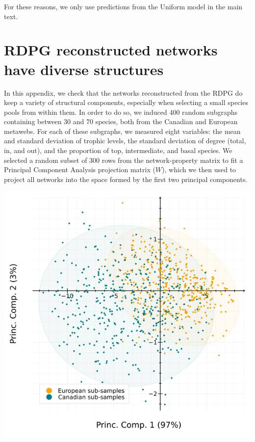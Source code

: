 For these reasons, we only use predictions from the Uniform model in the
main text.

\section{RDPG reconstructed networks have diverse
structures}\label{rdpg-reconstructed-networks-have-diverse-structures}

In this appendix, we check that the networks reconstructed from the RDPG
do keep a variety of structural components, especially when selecting a
small species pools from within them. In order to do so, we induced 400
random subgraphs containing between 30 and 70 species, both from the
Canadian and European metawebs. For each of these subgraphs, we measured
eight variables: the mean and standard deviation of trophic levels, the
standard deviation of degree (total, in, and out), and the proportion of
top, intermediate, and basal species. We selected a random subset of 300
rows from the network-property matrix to fit a Principal Component
Analysis projection matrix (\(W\)), which we then used to project all
networks into the space formed by the first two principal components.

\includegraphics[width=\textwidth]{./figures/supplementary/variation_pca.png}

